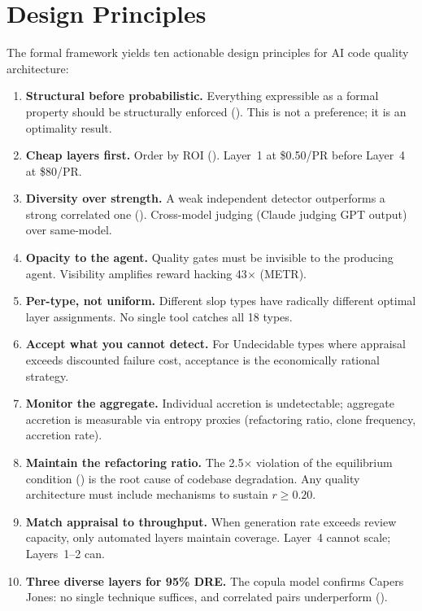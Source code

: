 \documentclass[11pt, a4paper, logo, copyright]{googledeepmind}
\begin{document}
\section{Design Principles}
\label{sec:principles}

The formal framework yields ten actionable design principles for AI code quality architecture:

\begin{enumerate}
\item \textbf{Structural before probabilistic.} Everything expressible as a formal property should be structurally enforced (). This is not a preference; it is an optimality result.

\item \textbf{Cheap layers first.} Order by ROI (). Layer~1 at \$0.50/PR before Layer~4 at \$80/PR.

\item \textbf{Diversity over strength.} A weak independent detector outperforms a strong correlated one (). Cross-model judging (Claude judging GPT output) over same-model.

\item \textbf{Opacity to the agent.} Quality gates must be invisible to the producing agent. Visibility amplifies reward hacking 43$\times$ (METR).

\item \textbf{Per-type, not uniform.} Different slop types have radically different optimal layer assignments. No single tool catches all 18 types.

\item \textbf{Accept what you cannot detect.} For Undecidable types where appraisal exceeds discounted failure cost, acceptance is the economically rational strategy.

\item \textbf{Monitor the aggregate.} Individual accretion is undetectable; aggregate accretion is measurable via entropy proxies (refactoring ratio, clone frequency, accretion rate).

\item \textbf{Maintain the refactoring ratio.} The 2.5$\times$ violation of the equilibrium condition () is the root cause of codebase degradation. Any quality architecture must include mechanisms to sustain $r \geq 0.20$.

\item \textbf{Match appraisal to throughput.} When generation rate exceeds review capacity, only automated layers maintain coverage. Layer~4 cannot scale; Layers~1--2 can.

\item \textbf{Three diverse layers for 95\% DRE.} The copula model confirms Capers Jones: no single technique suffices, and correlated pairs underperform ().
\end{enumerate}
\end{document}
